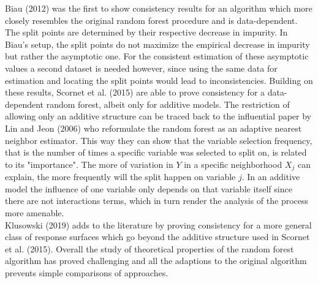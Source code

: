 {Biau (2012) was the first to show consistency results for an algorithm which more closely resembles the original random forest procedure and is data-dependent. The split points are determined by their respective decrease in impurity. In Biau's setup, the split points do not maximize the empirical decrease in impurity but rather the asymptotic one. For the consistent estimation of these asymptotic values a second dataset is needed however, since using the same data for estimation and locating the split points would lead to inconsistencies. Building on these results, Scornet et al. (2015) are able to prove consistency for a data-dependent random forest, albeit only for additive models. The restriction of allowing only an additive structure can be traced back to the influential paper by Lin and Jeon (2006) who reformulate the random forest as an adaptive nearest neighbor estimator. This way they can show that the variable selection frequency, that is the number of times a specific variable was selected to split on, is related to its "importance". The more of variation in $Y$ in a specific neighborhood $X_j$ can explain, the more frequently will the split happen on variable $j$. In an additive model the influence of one variable only depends on that variable itself since there are not interactions terms, which in turn render the analysis of the process more amenable. \\
Klusowski (2019) adds to the literature by proving consistency for a more general class of response surfaces which go beyond the additive structure used in Scornet et al. (2015). Overall the study of theoretical properties of the random forest algorithm has proved challenging and all the adaptions to the original algorithm prevents simple comparisons of approaches. 
}